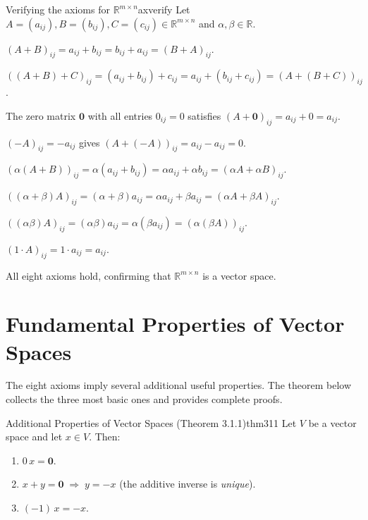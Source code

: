 \documentclass[12pt,a4paper]{article}
\newcommand{\R}{\mathbb{R}}
\newcommand{\vzero}{\mathbf{0}}
\begin{document}
\begin{example}{Verifying the axioms for $\R^{m\times n}$}{axverify}
  Let $A=(a_{ij}), B=(b_{ij}), C=(c_{ij}) \in \R^{m\times n}$ and
  $\alpha,\beta\in\R$.

  \begin{description}[leftmargin=2em, font=\bfseries\color{axiomblue}]
    \item[A1.] $(A+B)_{ij} = a_{ij}+b_{ij} = b_{ij}+a_{ij} = (B+A)_{ij}$.
    \item[A2.] $((A+B)+C)_{ij} = (a_{ij}+b_{ij})+c_{ij}
               = a_{ij}+(b_{ij}+c_{ij}) = (A+(B+C))_{ij}$.
    \item[A3.] The zero matrix $\vzero$ with all entries $0_{ij}=0$ satisfies
               $(A+\vzero)_{ij} = a_{ij}+0 = a_{ij}$.
    \item[A4.] $(-A)_{ij} = -a_{ij}$ gives $(A+(-A))_{ij} = a_{ij}-a_{ij} = 0$.
    \item[A5.] $(\alpha(A+B))_{ij} = \alpha(a_{ij}+b_{ij})
               = \alpha a_{ij}+\alpha b_{ij} = (\alpha A+\alpha B)_{ij}$.
    \item[A6.] $((\alpha+\beta)A)_{ij} = (\alpha+\beta)a_{ij}
               = \alpha a_{ij}+\beta a_{ij} = (\alpha A+\beta A)_{ij}$.
    \item[A7.] $((\alpha\beta)A)_{ij} = (\alpha\beta)a_{ij}
               = \alpha(\beta a_{ij}) = (\alpha(\beta A))_{ij}$.
    \item[A8.] $(1\cdot A)_{ij} = 1\cdot a_{ij} = a_{ij}$.
  \end{description}
  All eight axioms hold, confirming that $\R^{m\times n}$ is a vector space.
\end{example}

\section{Fundamental Properties of Vector Spaces}

\noindent
The eight axioms imply several additional useful properties.  The theorem below
collects the three most basic ones and provides complete proofs.

\begin{theorem}{Additional Properties of Vector Spaces (Theorem 3.1.1)}{thm311}
  Let $V$ be a vector space and let $x \in V$.  Then:
  \begin{enumerate}[label=(\roman*), leftmargin=2.5em]
    \item $0\, x = \vzero$.
    \item $x + y = \vzero \;\Longrightarrow\; y = -x$ \quad
          (the additive inverse is \emph{unique}).
    \item $(-1)\, x = -x$.
  \end{enumerate}
\end{theorem}
\end{document}
